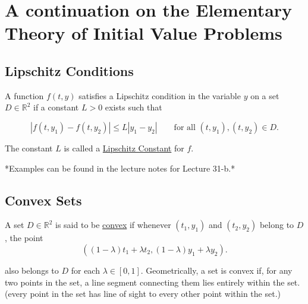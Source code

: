 \section{A continuation on the Elementary Theory of Initial Value Problems}

\subsection{Lipschitz Conditions}

 A function $f(t,y)$ satisfies a Lipschitz condition in the variable $y$ on
a set $D \in \mathbb{R}^2$ if a constant $L > 0$ exists such that

\[
  |f(t,y_1) - f(t, y_2)| \leq L|y_1 - y_2| \qquad \text{for all } (t,y_1), (t,y_2) \in D
.\]

The constant $L$ is called a \uline{Lipschitz Constant} for $f$.

*Examples can be found in the lecture notes for Lecture 31-b.*

\subsection{Convex Sets}

 A set $D\in \mathbb{R}^2$ is said to be \uline{convex} if whenever $(t_1,
y_1)$ and $(t_2,y_2)$ belong to $D$, the point
\begin{equation*}
  ((1-\lambda)t_1 + \lambda t_2, (1-\lambda)y_1 + \lambda y_2)
.\end{equation*}

\noindent
also belongs to $D$ for each $\lambda\in[0,1]$. Geometrically, a set is convex
if, for any two points in the set, a line segment connecting them lies entirely
within the set. (\ie every point in the set has line of sight to every other
point within the set.)


